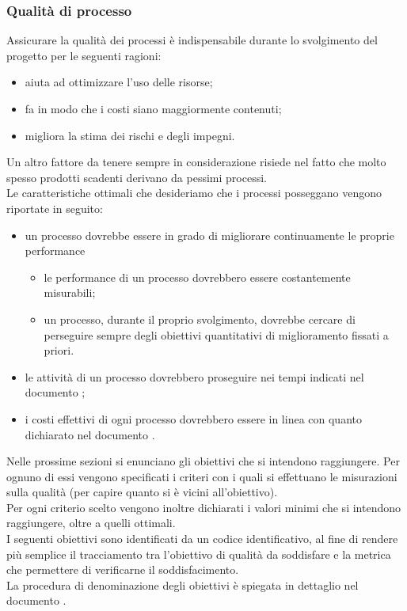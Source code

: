 \documentclass[../PianoDiQualifica.tex]{subfiles}
\begin{document}
		\subsubsection{Qualità di processo}
		Assicurare la qualità dei processi è indispensabile durante lo svolgimento del progetto per le seguenti ragioni:
		\begin{itemize}
		\item aiuta ad ottimizzare l'uso delle risorse;
		\item fa in modo che i costi siano maggiormente contenuti;
		\item migliora la stima dei rischi e degli impegni.
		\end{itemize}
		Un altro fattore da tenere sempre in considerazione risiede nel fatto che molto spesso prodotti scadenti derivano da pessimi processi.\\
		Le caratteristiche ottimali che desideriamo che i processi posseggano vengono riportate in seguito:
		\begin{itemize}
			\item un processo dovrebbe essere in grado di migliorare continuamente le proprie performance
			\begin{itemize}
				\item le performance di un processo dovrebbero essere costantemente misurabili;
				\item un processo, durante il proprio svolgimento, dovrebbe cercare di perseguire sempre degli obiettivi quantitativi di miglioramento fissati a priori.
			\end{itemize}
			\item le attività di un processo dovrebbero proseguire nei tempi indicati nel documento \pianodiprogettov;
			\item i costi effettivi di ogni processo dovrebbero essere in linea con quanto dichiarato nel documento \pianodiprogettov.
		\end{itemize}
		Nelle prossime sezioni si enunciano gli obiettivi che si intendono raggiungere. Per ognuno di essi vengono specificati i criteri con i quali si effettuano le misurazioni sulla qualità (per capire quanto si è vicini all’obiettivo).\\
		Per ogni criterio scelto vengono inoltre dichiarati i valori minimi che si intendono raggiungere, oltre a quelli ottimali.\\
		I seguenti obiettivi sono identificati da un codice identificativo, al fine di rendere più semplice il tracciamento tra l'obiettivo di qualità da soddisfare e la metrica che permettere di verificarne il soddisfacimento.\\
		La procedura di denominazione degli obiettivi è spiegata in dettaglio nel documento \normediprogettov.
			
\end{document}
